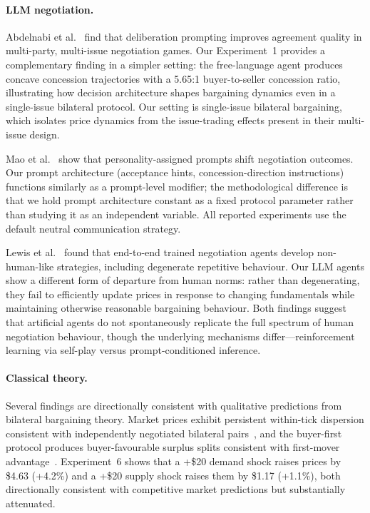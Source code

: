 \paragraph{LLM negotiation.}
Abdelnabi et al.~\cite{abdelnabi2024llmdeliberation} find that deliberation prompting improves agreement quality in multi-party, multi-issue negotiation games.  Our Experiment~1 provides a complementary finding in a simpler setting: the free-language agent produces concave concession trajectories with a 5.65:1 buyer-to-seller concession ratio, illustrating how decision architecture shapes bargaining dynamics even in a single-issue bilateral protocol.  Our setting is single-issue bilateral bargaining, which isolates price dynamics from the issue-trading effects present in their multi-issue design.

Mao et al.~\cite{mao2024personalities} show that personality-assigned prompts shift negotiation outcomes.  Our prompt architecture (acceptance hints, concession-direction instructions) functions similarly as a prompt-level modifier; the methodological difference is that we hold prompt architecture constant as a fixed protocol parameter rather than studying it as an independent variable.  All reported experiments use the default neutral communication strategy.

Lewis et al.~\cite{lewis2017dealornodeal} found that end-to-end trained negotiation agents develop non-human-like strategies, including degenerate repetitive behaviour.  Our LLM agents show a different form of departure from human norms: rather than degenerating, they fail to efficiently update prices in response to changing fundamentals while maintaining otherwise reasonable bargaining behaviour.  Both findings suggest that artificial agents do not spontaneously replicate the full spectrum of human negotiation behaviour, though the underlying mechanisms differ---reinforcement learning via self-play versus prompt-conditioned inference.

\paragraph{Classical theory.}
Several findings are directionally consistent with qualitative predictions from bilateral bargaining theory.  Market prices exhibit persistent within-tick dispersion consistent with independently negotiated bilateral pairs~\cite{rubinstein1985}, and the buyer-first protocol produces buyer-favourable surplus splits consistent with first-mover advantage~\cite{rubinstein1982}.  Experiment~6 shows that a +\$20 demand shock raises prices by \$4.63 (+4.2\%) and a +\$20 supply shock raises them by \$1.17 (+1.1\%), both directionally consistent with competitive market predictions but substantially attenuated.

